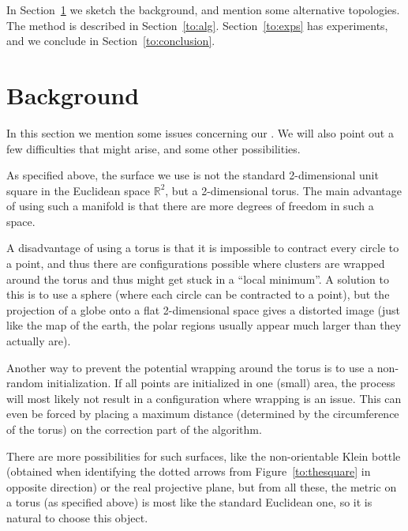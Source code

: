 \documentclass{article}
\theoremstyle{definition}
\begin{document}
In Section~\ref{to:space} we sketch the background, and mention some alternative
topologies. The method is described in Section~\ref{to:alg}. Section~\ref{to:exps}
has experiments, and we conclude in Section~\ref{to:conclusion}.


\section{Background}\label{to:space}
In this section we mention some issues concerning our
. We will also point out a few difficulties that
might arise, and some other possibilities.

As specified above, the surface we use is not the standard 2-dimensional unit
square in the Euclidean space $\mathbb{R}^2$, but a 2-dimensional torus. The
main advantage of using such a manifold is that there are more degrees of
freedom in such a space.

A disadvantage of using a torus is that it is impossible to contract every
circle to a point, and thus there are configurations possible where clusters
are wrapped around the torus and thus might get stuck in a ``local minimum''.
A solution to this is to use a sphere (where each circle can be contracted to a
point), but the projection of a globe onto a flat 2-dimensional space gives a
distorted image (just like the map of the earth, the polar regions usually
appear much larger than they actually are).

Another way to prevent the potential wrapping around the torus is to use a
non-random initialization. If all points are initialized in one (small) area,
the process will most likely not result in a configuration where wrapping is
an issue. This can even be forced by placing a maximum distance (determined by
the circumference of the torus) on the correction part of the algorithm.

There are more possibilities for such surfaces, like the non-orientable Klein
bottle (obtained when identifying the dotted arrows from
Figure~\ref{to:thesquare} in opposite direction) or the real projective plane, but from all these, the metric on a torus
(as specified above) is most like the standard Euclidean one, so it is natural
to choose this object.
\end{document}
